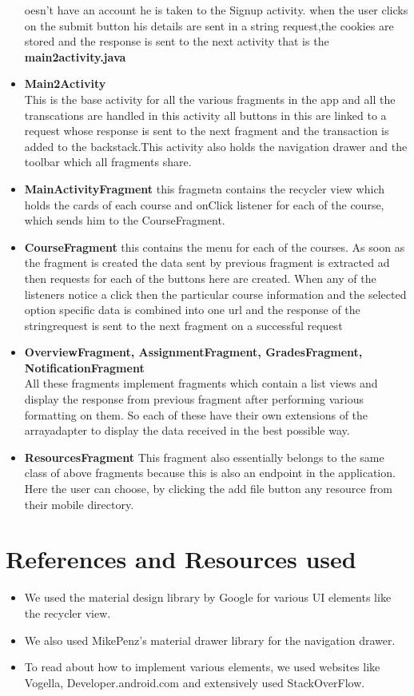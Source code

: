 \documentclass[12pt]{article}
\begin{document}
\begin{itemize}
oesn't have an account he is taken to the Signup activity.
when the user clicks on the submit button his details are sent in a string request,the cookies are stored and the response is sent to the next activity that is the \textbf{main2activity.java}\\
\item\textbf{Main2Activity}\\
This is the base activity for all the various fragments in the app and all the transcations are handled in this activity all buttons in this are linked to a request whose response is sent to the next fragment and the transaction is added to the backstack.This activity also holds the navigation drawer and the toolbar which all fragments share.
\item \textbf{MainActivityFragment} this fragmetn contains the recycler view which holds the cards of each course and onClick listener for each of the course, which sends him to the CourseFragment.
\item \textbf{CourseFragment} this contains the menu for each of the courses. As soon as the fragment is created the data sent by previous fragment is extracted ad then requests for each of the buttons here are created. When any of the listeners notice a click then the particular course information and the selected option specific data is combined into one url and the response of the stringrequest is sent to the next fragment on a successful request

\item \textbf{OverviewFragment, AssignmentFragment, GradesFragment, NotificationFragment} \\
All these fragments implement fragments which contain a list views and display the response from previous fragment after performing various formatting on them. So each of these have their own extensions of the arrayadapter to display the data received in the best possible way.
\item \textbf{ResourcesFragment} This fragment also essentially belongs to the same class of above fragments because this is also an endpoint in the application. Here the user can choose, by clicking the add file button any resource from their mobile directory.
\end{itemize}

\section{References and Resources used}
\begin{itemize}
\item We used the material design library by Google for various UI elements like the recycler view.
\item We also used MikePenz's material drawer library for the navigation drawer.
\item To read about how to implement various elements, we used websites like Vogella, Developer.android.com and extensively used StackOverFlow.
\end{itemize}
\end{document}
